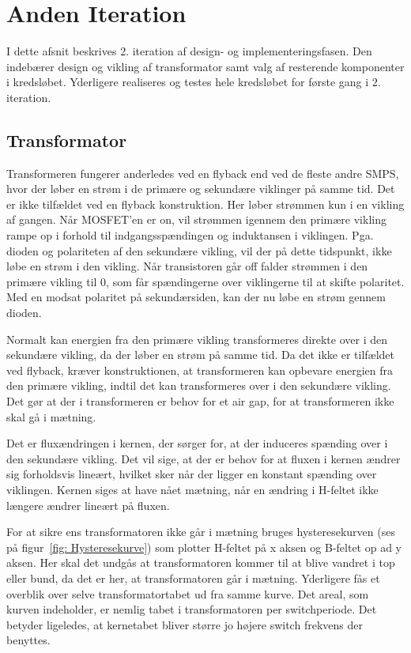 \chapter{Anden Iteration}
I dette afsnit beskrives 2. iteration af design- og implementeringsfasen. Den indebærer design og vikling af transformator samt valg af resterende komponenter i kredsløbet. Yderligere realiseres og testes hele kredsløbet for første gang i 2. iteration.

\section{Transformator}
Transformeren fungerer anderledes ved en flyback end ved de fleste andre SMPS, hvor der løber en strøm i de primære og sekundære viklinger på samme tid. Det er ikke tilfældet ved en flyback konstruktion. Her løber strømmen kun i en vikling af gangen. Når MOSFET’en er on, vil strømmen igennem den primære vikling rampe op i forhold til indgangsspændingen og induktansen i viklingen. Pga. dioden og polariteten af den sekundære vikling, vil der på dette tidspunkt, ikke løbe en strøm i den vikling. Når transistoren går off falder strømmen i den primære vikling til 0, som får spændingerne over viklingerne til at skifte polaritet. Med en modsat polaritet på sekundærsiden, kan der nu løbe en strøm gennem dioden. 


\noindent Normalt kan energien fra den primære vikling transformeres direkte over i den sekundære vikling, da der løber en strøm på samme tid. Da det ikke er tilfældet ved flyback, kræver konstruktionen, at transformeren kan opbevare energien fra den primære vikling, indtil det kan transformeres over i den sekundære vikling. Det gør at der i transformeren er behov for et air gap, for at transformeren ikke skal gå i mætning. 


\noindent Det er fluxændringen i kernen, der sørger for, at der induceres spænding over i den sekundære vikling. Det vil sige, at der er behov for at fluxen i kernen ændrer sig forholdsvis lineært, hvilket sker når der ligger en konstant spænding over viklingen. Kernen siges at have nået mætning, når en ændring i H-feltet ikke længere ændrer lineært på fluxen. 


\noindent For at sikre ens transformatoren ikke går i mætning bruges hysteresekurven (ses på figur~\ref{fig: Hysteresekurve}) som plotter H-feltet på x aksen og B-feltet op ad y aksen. Her skal det undgås at transformatoren kommer til at blive vandret i top eller bund, da det er her, at transformatoren går i mætning. Yderligere fås et overblik over selve transformatortabet ud fra samme kurve. Det areal, som kurven indeholder, er nemlig tabet i transformatoren per switchperiode. Det betyder ligeledes, at kernetabet bliver større jo højere switch frekvens der benyttes. 

